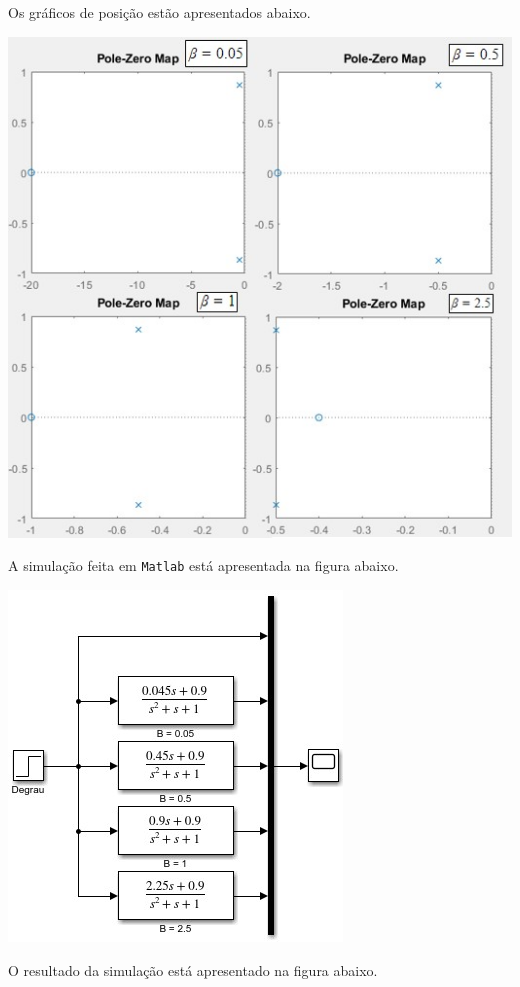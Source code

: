 \documentclass[
]{book}
\begin{document}
Os gráficos de posição estão apresentados abaixo.

\includegraphics{Imagens/Lab2/prob5Varios.jpg}

A simulação feita em \texttt{Matlab} está apresentada na figura abaixo.

\includegraphics{Imagens/Lab2/modelSim5.jpg}

O resultado da simulação está apresentado na figura abaixo.
\end{document}

